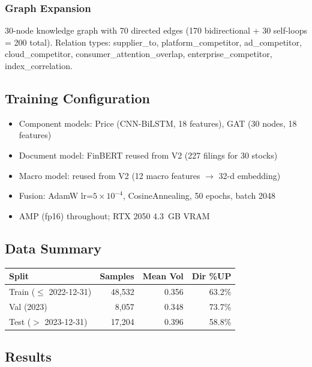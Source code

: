 \documentclass[12pt,a4paper]{article}
\begin{document}
\subsubsection{Graph Expansion}
30-node knowledge graph with 70 directed edges (170 bidirectional + 30 self-loops = 200 total).
Relation types: supplier\_to, platform\_competitor, ad\_competitor, cloud\_competitor,
consumer\_attention\_overlap, enterprise\_competitor, index\_correlation.

\subsection{Training Configuration}
\begin{itemize}
    \item Component models: Price (CNN-BiLSTM, 18 features), GAT (30 nodes, 18 features)
    \item Document model: FinBERT reused from V2 (227 filings for 30 stocks)
    \item Macro model: reused from V2 (12 macro features $\to$ 32-d embedding)
    \item Fusion: AdamW lr=$5\times10^{-4}$, CosineAnnealing, 50 epochs, batch 2048
    \item AMP (fp16) throughout; RTX 2050 4.3~GB VRAM
\end{itemize}

\subsection{Data Summary}

\begin{center}
\begin{tabular}{lrrr}
\hline
\textbf{Split} & \textbf{Samples} & \textbf{Mean Vol} & \textbf{Dir \%UP} \\
\hline
Train ($\leq$ 2022-12-31) & 48,532 & 0.356 & 63.2\% \\
Val (2023)                & 8,057  & 0.348 & 73.7\% \\
Test ($>$ 2023-12-31)     & 17,204 & 0.396 & 58.8\% \\
\hline
\end{tabular}
\end{center}

\subsection{Results}
\end{document}
